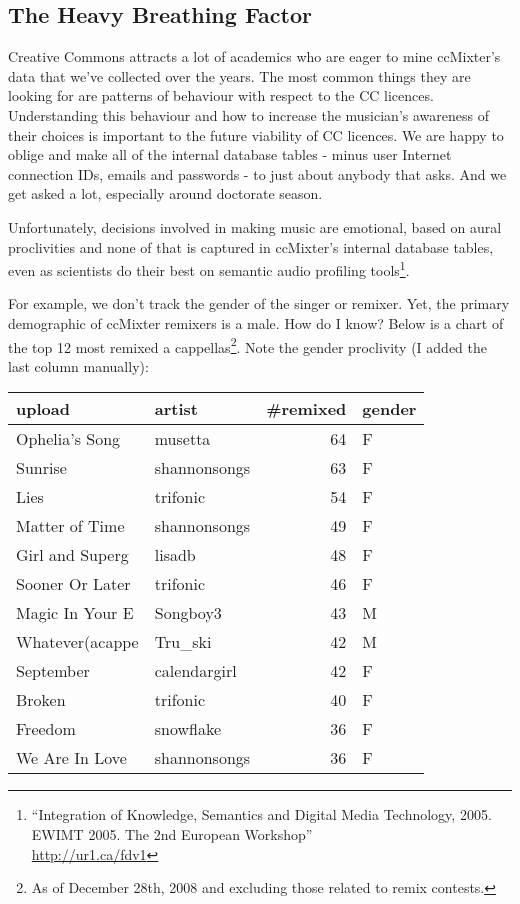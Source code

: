 \subsection{The Heavy Breathing Factor}
\label{ss:unexpected_collaboration:license:heavy_breathing_factor}

Creative Commons attracts a lot of academics who are eager to mine ccMixter's
data that we've collected over the years. The most common things they are
looking for are patterns of behaviour with respect to the CC licences.
Understanding this behaviour and how to increase the musician's awareness of
their choices is important to the future viability of CC licences. We are happy
to oblige and make all of the internal database tables - minus user Internet
connection IDs, emails and passwords - to just about anybody that asks. And we
get asked a lot, especially around doctorate season. 

Unfortunately, decisions involved in making music are emotional, based on aural
proclivities and none of that is captured in ccMixter's internal database
tables, even as scientists do their best on semantic audio prof\hbox{}iling
tools\footnote{``Integration of Knowledge, Semantics and Digital Media
Technology, 2005. EWIMT 2005. The 2nd European Workshop''\\
\url{http://ur1.ca/fdv1}}.

For example, we don't track the gender of the singer or remixer. Yet, the
primary demographic of ccMixter remixers is a male. How do I know?  Below is a
chart of the top 12 most remixed a cappellas\footnote{As of December 28th, 2008
and excluding those related to remix contests.}. Note the gender proclivity (I
added the last column manually):

\begin{table}[h]
\label{t:unexpected_collaboration:license:heavy_breathing_factor:remixes}
\begin{tabular}{|l|l|r|l|}

\hline
upload & artist & \#remixed & gender\\

\hline
Ophelia's Song & musetta & 64 & F\\
Sunrise & shannonsongs & 63 & F\\ 
Lies & trifonic & 54 & F\\
Matter of Time & shannonsongs & 49 & F\\
Girl and Superg & lisadb & 48 & F\\
Sooner Or Later & trifonic & 46 & F\\
Magic In Your E & Songboy3 & 43 & M\\
Whatever(acappe & Tru\_ski & 42 & M\\
September & calendargirl & 42 & F\\
Broken & trifonic & 40 & F\\
Freedom & snowf\hbox{}lake & 36 & F\\
We Are In Love & shannonsongs & 36 & F\\
\hline
\end{tabular}
\end{table}

